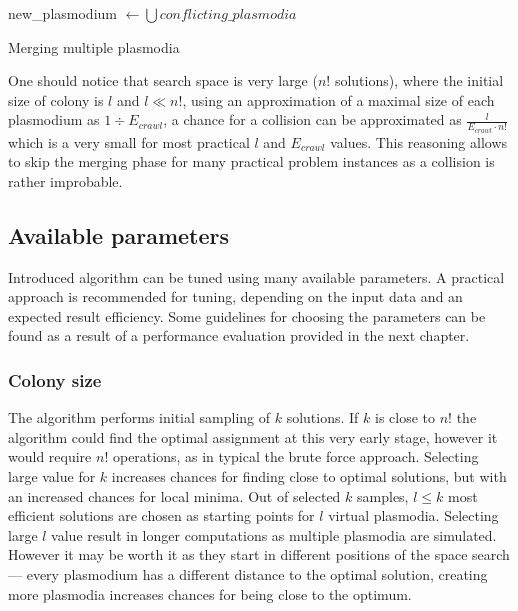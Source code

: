 \documentclass[english,a4paper,twoside]{ppfcmthesis}
\begin{document}
\begin{algorithm}
  \BlankLine
  
  new\_plasmodium $\leftarrow \bigcup{conflicting\_plasmodia}$\;


  \;

  \caption{Merging multiple plasmodia}
  \label{algorithm:m_merging}
\end{algorithm}

One should notice that search space is very large ($n!$ solutions), where the initial size of colony is $l$ and $l \ll n!$, using an approximation of a maximal size of each plasmodium as $1 \div E_{crawl}$, a chance for a collision can be approximated as $\frac{l}{E_{crawl} \cdot n!}$ which is a very small for most practical $l$ and $E_{crawl}$ values. This reasoning allows to skip the merging phase for many practical problem instances as a collision is rather improbable.


\subsection{Available parameters}
\label{subsection:am_parameters}

Introduced algorithm can be tuned using many available parameters. A practical approach is recommended for tuning, depending on the input data and an expected result efficiency. Some guidelines for choosing the parameters can be found as a result of a performance evaluation provided in the next chapter.

\subsubsection{Colony size}

The algorithm performs initial sampling of $k$ solutions. If $k$ is close to $n!$ the algorithm could find the optimal assignment at this very early stage, however it would require $n!$ operations, as in typical the brute force approach. Selecting large value for $k$ increases chances for finding close to optimal solutions, but with an increased chances for local minima. Out of selected $k$ samples, $l \leq k$ most efficient solutions are chosen as starting points for $l$ virtual plasmodia. Selecting large $l$ value result in longer computations as multiple plasmodia are simulated. However it may be worth it as they start in different positions of the space search --- every plasmodium has a different distance to the optimal solution, creating more plasmodia increases chances for being close to the optimum.
\end{document}

